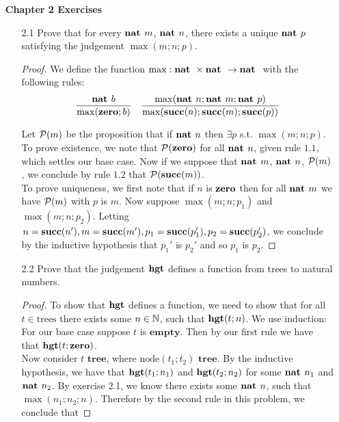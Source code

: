 \documentclass[11pt]{article}
\begin{document}
\begin{enumerate}
\item[] \textbf{Chapter 2 Exercises}
\begin{enumerate}
    \item[2.1] 
    Prove that for every $\textbf{nat } m$, $\textbf{nat } n$, there exists a unique $\textbf{nat } p$ satisfying the judgement $\max(m; n; p)$.
    \begin{proof}
    We define the function $\max: \textbf{nat } \times \textbf{nat } \to \textbf{nat }$ with the following rules:
    \begin{align}
    \frac{\textbf{nat } b}{\max(\textbf{zero}; b)} && 
    \frac{\max(\textbf{nat } n; \textbf{nat } m; \textbf{nat } p)}{\max(\textbf{succ}(n); \textbf{succ}(m); \textbf{succ}(p))} 
    \end{align}
    
    Let $\mathcal{P}(m)$ be the proposition that if $\textbf{nat } n$ then $\exists p$ s.t. $\max(m; n; p)$.\\
    
    To prove existence, we note that $\mathcal{P}(\textbf{zero})$ for all $\textbf{nat } n$, given rule $1.1$, which settles our base case. Now if we suppose that $\textbf{nat } m$, $\textbf{nat } n$, $\mathcal{P}(m)$, we conclude by rule $1.2$ that $\mathcal{P}(\textbf{succ}(m))$.\\
    
    To prove uniqueness, we first note that if $n$ is $\textbf{zero}$ then for all $\textbf{nat } m$ we have $\mathcal{P}(m)$ with $p$ is $m$. Now suppose $\max(m; n; p_1)$ and $\max(m; n; p_2)$. Letting $n = \textbf{succ}(n'), m= \textbf{succ}(m'), p_1 = \textbf{succ}(p_1'), p_2 = \textbf{succ}(p_2')$, we conclude by the inductive hypothesis that $p_1'$ is $p_2'$ and so $p_1$ is $p_2$. 
    \end{proof}
    
    \item[2.2]
    Prove that the judgement $\textbf{hgt}$ defines a function from trees to natural numbers.
    \begin{proof}
    To show that $\textbf{hgt}$ defines a function, we need to show that for all $t \in \text{trees}$ there exists some $n \in \mathbb{N}$, such that $\textbf{hgt}(t;n)$. We use induction:\\
    
    For our base case suppose $t$ is $\textbf{empty}$. Then by our first rule we have that $\textbf{hgt}(t;\textbf{zero})$.\\
    
    Now consider $t \textbf{ tree}$, where $\text{node}(t_1; t_2) \textbf{ tree}$. By the inductive hypothesis, we have that $\textbf{hgt}(t_1;n_1)$ and $\textbf{hgt}(t_2;n_2)$ for some $\textbf{nat } n_1$ and $\textbf{nat } n_2$. By exercise 2.1, we know there exists some $\textbf{nat } n$, such that $\max(n_1;n_2;n)$. Therefore by the second rule in this problem, we conclude that 
    

\end{proof}
\end{enumerate}
\end{enumerate}
\end{document}
